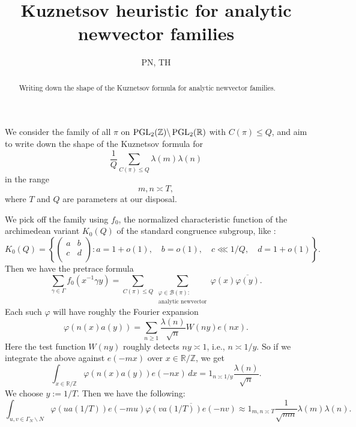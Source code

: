 \documentclass[reqno]{amsart} 
\title{Kuznetsov heuristic for analytic newvector families}
\author{PN, TH}
\begin{document}
\begin{abstract}
  Writing down the shape of the Kuznetsov formula for analytic newvector families.
\end{abstract}

We consider the family of all $\pi$ on $\operatorname{PGL}_2(\mathbb{Z}) \backslash \operatorname{PGL}_2(\mathbb{R})$ with $C(\pi) \leq Q$, and aim to write down the shape of the Kuznetsov formula for
\begin{equation*}
  \frac{1}{Q}\sum _{C(\pi) \leq Q} \lambda(m) \lambda(n)
\end{equation*}
in the range
\begin{equation*}
m, n \asymp T,
\end{equation*}
where $T$ and $Q$ are parameters at our disposal.

We pick off the family using $f_0$, the normalized characteristic function of the archimedean variant $K_0(Q)$ of the standard congruence subgroup, like \cite{JN19a}:
\begin{equation*}
  K_0(Q)
  = \left\{
    \begin{pmatrix}
a & b \\
c & d \\
    \end{pmatrix}
    :
    a = 1 + o(1), \quad
    b = o(1),
    \quad
    c \lll 1/Q,
    \quad
    d = 1 + o(1)
  \right\}.
\end{equation*}
Then we have the pretrace formula
\begin{equation*}
  \sum _{\gamma \in \Gamma } f_0 (x  ^{-1} \gamma y)
  =
  \sum _{C(\pi) \leq Q } \sum _{
    \substack{
      \varphi \in \mathcal{B}(\pi) :  \\
      \text{analytic newvector}
    }
  } \varphi(x) \overline{\varphi(y)}.
\end{equation*}
Each such $\varphi$ will have roughly the Fourier expansion
\begin{equation*}
  \varphi( n(x) a(y)) = \sum _{n \geq 1} \frac{\lambda(n)}{ \sqrt{n} } W(n y) e(n x).
\end{equation*}
Here the test function $W(n y)$ roughly detects $n y \asymp 1$, i.e., $n \asymp 1/y$.  So if we integrate the above against $e(-m x)$ over $x \in \mathbb{R} / \mathbb{Z}$, we get
\begin{equation*}
  \int _{x \in \mathbb{R} / \mathbb{Z} } \varphi(n(x) a(y)) e(-n x) \, d x
  =
  1 _{n \asymp 1/y} \frac{\lambda(n)}{ \sqrt{n}}.
\end{equation*}
We choose $y := 1/T$.  Then we have the following:
\begin{equation*}
  \int _{u, v \in \Gamma_N \backslash N} \varphi(u a(1/T)) e(-m u) \overline{\varphi(v a(1/T)) e(-n v)}
  \approx
  1 _{m, n \asymp T} \frac{1}{ \sqrt{m n}} \lambda(m) \lambda(n).  
\end{equation*}
\end{document}

